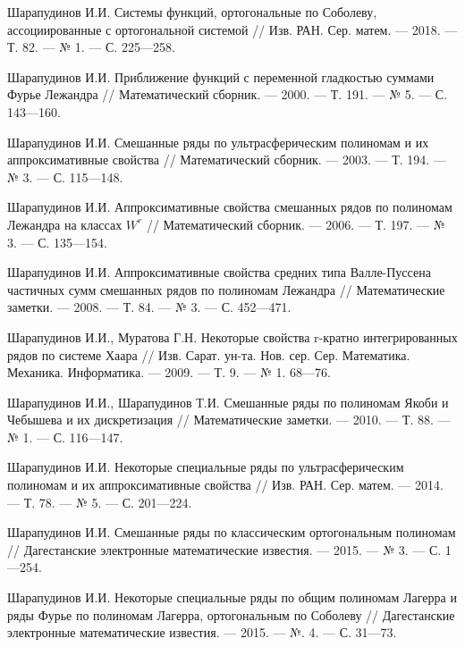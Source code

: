 \begin{thebibliography}{20}
	
Шарапудинов И.И. Системы функций, ортогональные по Соболеву, ассоциированные с ортогональной системой // Изв. РАН. Сер. матем. --- 2018. --- Т. 82. --- № 1. --- С. 225---258.



Шарапудинов И.И. Приближение функций с переменной гладкостью суммами Фурье Лежандра // Математический сборник. --- 2000. --- Т. 191. --- № 5. --- С. 143---160.



Шарапудинов И.И. Смешанные ряды по ультрасферическим полиномам и их аппроксимативные свойства // Математический сборник. --- 2003. --- Т. 194. --- № 3. --- С. 115---148.



Шарапудинов И.И. Аппроксимативные свойства смешанных рядов по полиномам Лежандра на классах $W^r$ // Математический сборник. --- 2006. --- Т. 197. --- № 3. --- С. 135---154.


Шарапудинов И.И. Аппроксимативные свойства средних типа Валле-Пуссена частичных сумм смешанных рядов по полиномам Лежандра // Математические заметки. --- 2008. --- Т. 84. --- № 3. --- С. 452---471.


Шарапудинов И.И., Муратова Г.Н. Некоторые свойства r-кратно интегрированных рядов по системе Хаара // Изв. Сарат. ун-та. Нов. сер. Сер. Математика. Механика. Информатика. --- 2009. --- Т. 9. --- № 1. 68---76.



Шарапудинов И.И., Шарапудинов Т.И. Смешанные ряды по полиномам Якоби и Чебышева и их дискретизация // Математические заметки. --- 2010. --- Т. 88. --- № 1. --- С. 116---147.



Шарапудинов И.И. Некоторые специальные ряды по ультрасферическим полиномам и их аппроксимативные свойства // Изв. РАН. Сер. матем. --- 2014. --- Т. 78. --- № 5. --- С. 201---224.



Шарапудинов И.И. Смешанные ряды по классическим ортогональным полиномам // Дагестанские электронные математические известия. --- 2015. --- № 3. --- С. 1---254.



Шарапудинов И.И. Некоторые специальные ряды по общим полиномам Лагерра и ряды Фурье по полиномам Лагерра, ортогональным по Соболеву // Дагестанские электронные математические известия. --- 2015. --- №. 4. --- С. 31---73.




\end{thebibliography}
